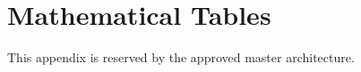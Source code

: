 \chapter{Mathematical Tables}
\label{app:mathematical_tables}

This appendix is reserved by the approved master architecture.
